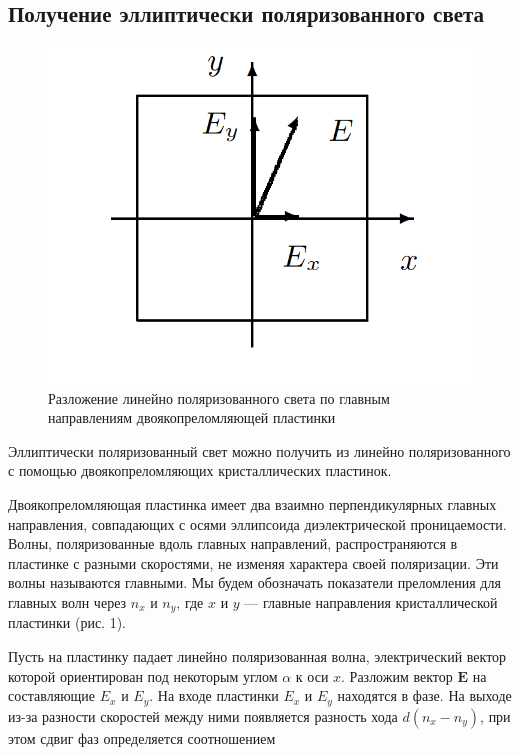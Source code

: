 \documentclass[12pt, a4paper]{article}
\begin{document}
\subsection{Получение эллиптически поляризованного света}
\begin{figure}
    \vspace{-5mm}
    \includegraphics[width=\linewidth]{pics/1.png}
    \caption{Разложение линейно поляризованного света по главным направлениям двоякопреломляющей пластинки}
    \label{pic:1}
\end{figure}

Эллиптически поляризованный свет можно получить из линейно поляризованного с
помощью двоякопреломляющих кристаллических пластинок.

Двоякопреломляющая пластинка имеет два взаимно перпендикулярных главных
направления, совпадающих с осями эллипсоида диэлектрической проницаемости.
Волны, поляризованные вдоль главных направлений, распространяются в пластинке с
разными скоростями, не изменяя характера своей поляризации. Эти волны
называются главными. Мы будем обозначать показатели преломления для главных
волн через $ n_x $ и $ n_y $, где $ x $ и $ y $ --- главные направления
кристаллической пластинки (рис. 1).

Пусть на пластинку падает линейно поляризованная волна, электрический вектор
которой ориентирован под некоторым углом $ \alpha $ к оси $ x $. Разложим
вектор $ \mathbf{E} $ на составляющие $ E_x $ и $ E_y $. На входе пластинки $
    E_x $ и $ E_y $ находятся в фазе. На выходе из-за разности скоростей между ними
появляется разность хода $ d(n_x - n_y) $, при этом сдвиг фаз определяется
соотношением
\end{document}

